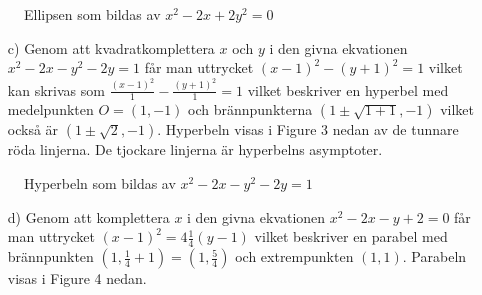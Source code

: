 \documentclass{article}
\begin{document}
\newpage

\begin{figure}[h]
    \center
    \caption{\footnotesize Ellipsen som bildas av $x^2-2x+2y^2=0$}
\end{figure}

\begin{enumerate}
    \item[c)] Genom att kvadratkomplettera $x$ och $y$ i den givna ekvationen $x^2-2x-y^2-2y=1$ får man uttrycket $(x-1)^2-(y+1)^2=1$ vilket kan skrivas som $\frac{(x-1)^2}{1}-\frac{(y+1)^2}{1}=1$ vilket beskriver en hyperbel med medelpunkten $O=(1, -1)$ och brännpunkterna $(1 \pm \sqrt{1+1}, -1)$ vilket också är $(1 \pm \sqrt{2}, -1)$. Hyperbeln visas i Figure 3 nedan av de tunnare röda linjerna. De tjockare linjerna är hyperbelns asymptoter.
\end{enumerate}

\begin{figure}[h]
    \center
    \caption{\footnotesize Hyperbeln som bildas av $x^2-2x-y^2-2y=1$}
\end{figure}

\begin{enumerate}
\item[d)] Genom att komplettera $x$ i den givna ekvationen $x^2-2x-y+2=0$ får man uttrycket $(x-1)^2=4\frac{1}{4}(y-1)$ vilket beskriver en parabel med brännpunkten $(1, \frac{1}{4}+1)=(1, \frac{5}{4})$ och extrempunkten $(1, 1)$. Parabeln visas i Figure 4 nedan.
\end{enumerate}
\end{document}
